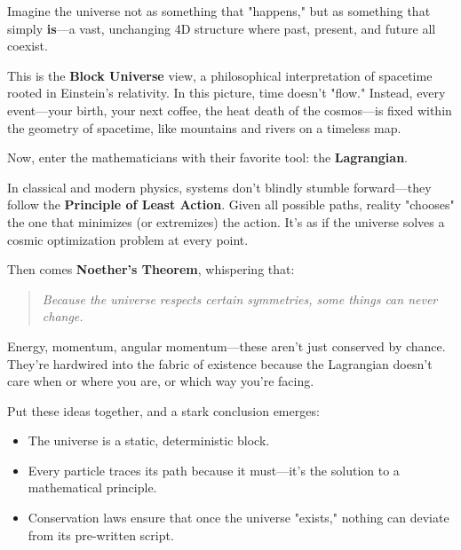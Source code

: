 \begin{tcolorbox}[colback=gray!5!white, colframe=gray!50!black, breakable, title={Historical Sidebar: The Block Universe—When Physics Froze Time}]

    Imagine the universe not as something that "happens," but as something that simply \textbf{is}—a vast, unchanging 4D structure where past, present, and future all coexist.

    \medskip
    
    This is the \textbf{Block Universe} view, a philosophical interpretation of spacetime rooted in Einstein’s relativity. In this picture, time doesn’t "flow." Instead, every event—your birth, your next coffee, the heat death of the cosmos—is fixed within the geometry of spacetime, like mountains and rivers on a timeless map.
    
    \medskip
    
    Now, enter the mathematicians with their favorite tool: the \textbf{Lagrangian}.

    \medskip
    
    In classical and modern physics, systems don’t blindly stumble forward—they follow the \textbf{Principle of Least Action}. Given all possible paths, reality "chooses" the one that minimizes (or extremizes) the action. It’s as if the universe solves a cosmic optimization problem at every point.
    
    \medskip
    
    Then comes \textbf{Noether’s Theorem}, whispering that:

    \medskip
    
    \begin{quote}
    \textit{Because the universe respects certain symmetries, some things can never change.}
    \end{quote}
    
    Energy, momentum, angular momentum—these aren’t just conserved by chance. They’re hardwired into the fabric of existence because the Lagrangian doesn’t care when or where you are, or which way you’re facing.
    
    \medskip
    
    Put these ideas together, and a stark conclusion emerges:

    \medskip
    
    \begin{itemize}
      \item The universe is a static, deterministic block.
      \item Every particle traces its path because it must—it’s the solution to a mathematical principle.
      \item Conservation laws ensure that once the universe "exists," nothing can deviate from its pre-written script.
    \end{itemize}


\end{tcolorbox}
